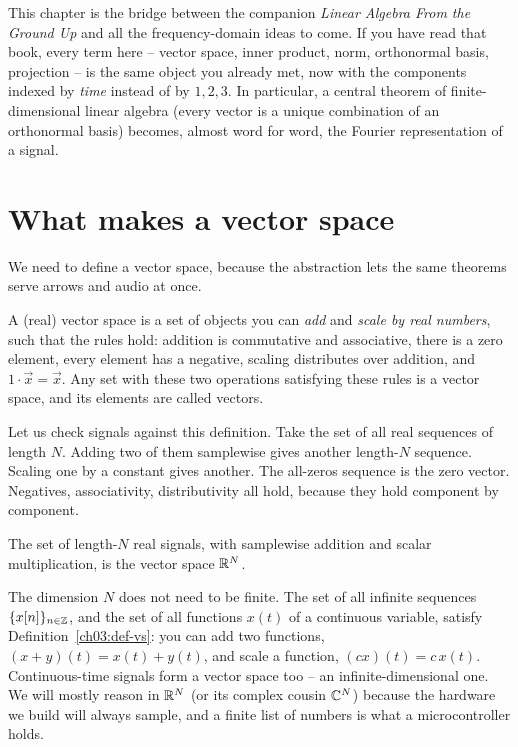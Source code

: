 \begin{connectionbox}
This chapter is the bridge between the companion \emph{Linear Algebra From the Ground Up} and all
the frequency-domain ideas to come. If you have read that book, every term here -- vector space,
inner product, norm, orthonormal basis, projection -- is the same object you already met, now with
the components indexed by \emph{time} instead of by $1,2,3$. In particular, a central theorem
of finite-dimensional linear algebra (every vector is a unique combination of an orthonormal basis)
becomes, almost word for word, the Fourier representation of a signal.
\end{connectionbox}

\section{What makes a vector space}
\label{ch03:vector-space}

We need to define a vector space, because the abstraction lets the same theorems serve arrows and audio at once.

\begin{definition}
\label{ch03:def-vs}
A (real) vector space is a set of objects you can \emph{add} and \emph{scale by real numbers}, such
that the rules hold: addition is commutative and associative, there is a zero element, every
element has a negative, scaling distributes over addition, and $1\cdot\vec{x}=\vec{x}$. Any set with
these two operations satisfying these rules is a vector space, and its elements are called vectors.
\end{definition}

Let us check signals against this definition. Take the set of all real sequences of length $N$. Adding
two of them samplewise gives another length-$N$ sequence. Scaling one by a constant gives another.
The all-zeros sequence is the zero vector. Negatives, associativity, distributivity all hold,
because they hold component by component.

\begin{proposition}
\label{ch03:prop-RN}
The set of length-$N$ real signals, with samplewise addition and scalar multiplication, is the
vector space $\mathbb{R}^N$.
\end{proposition}

The dimension $N$ does not need to be finite. The set of all infinite sequences
$\{x[n]\}_{n\in\mathbb{Z}}$, and the set of all functions $x(t)$ of a continuous variable, satisfy
Definition~\ref{ch03:def-vs}: you can add two functions, $(x+y)(t) = x(t)+y(t)$, and
scale a function, $(cx)(t)=c\,x(t)$. Continuous-time signals form a vector space too -- an
infinite-dimensional one. We will mostly reason in $\mathbb{R}^N$ (or its complex cousin $\mathbb{C}^N$) because the
hardware we build will always sample, and a finite list of numbers is what a microcontroller
holds.

